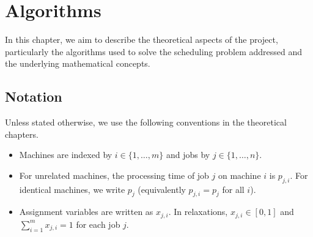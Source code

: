 \chapter{Algorithms}
\label{ch:algorithms}

In this chapter, we aim to describe the theoretical aspects of the project, particularly the algorithms used to solve the scheduling problem addressed and the underlying mathematical concepts.

\section*{Notation}
Unless stated otherwise, we use the following conventions in the theoretical chapters.

\begin{itemize}
  \item Machines are indexed by $i \in \{1,\dots,m\}$ and jobs by $j \in \{1,\dots,n\}$.
  \item For unrelated machines, the processing time of job $j$ on machine $i$ is $p_{j,i}$.
        For identical machines, we write $p_j$ (equivalently $p_{j,i}=p_j$ for all $i$).
  \item Assignment variables are written as $x_{j,i}$. In relaxations, $x_{j,i}\in[0,1]$ and $\sum_{i=1}^m x_{j,i}=1$ for each job $j$.
\end{itemize}



